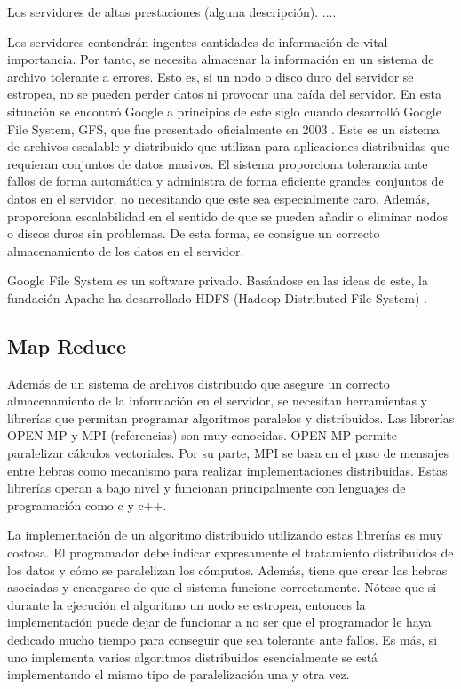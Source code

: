 \documentclass[10pt]{article}
\begin{document}
		Los servidores de altas prestaciones (alguna descripción). .... 
		
		Los servidores contendrán ingentes cantidades de información de vital importancia. Por tanto, se necesita almacenar la información en un sistema de archivo tolerante a errores. Esto es, si un nodo o disco duro del servidor se estropea, no se pueden perder datos ni provocar una caída del servidor. En esta situación se encontró Google a principios de este siglo cuando desarrolló Google File System, GFS, que fue presentado oficialmente en 2003 \cite{gfs}. Este es un sistema de archivos escalable y distribuido que utilizan para aplicaciones distribuidas que requieran conjuntos de datos masivos. El sistema proporciona tolerancia ante fallos de forma automática y administra de forma eficiente grandes conjuntos de datos en el servidor, no necesitando que este sea especialmente caro. Además, proporciona escalabilidad en el sentido de que se pueden añadir o eliminar nodos o discos duros sin problemas. De esta forma, se consigue un correcto almacenamiento de los datos en el servidor.
		
		Google File System es un software privado. Basándose en las ideas de este, la fundación Apache ha desarrollado HDFS (Hadoop Distributed File System) \cite{hdfs}.

	\subsection{Map Reduce}


		Además de un sistema de archivos distribuido que asegure un correcto almacenamiento de la información en el servidor, se necesitan herramientas y librerías que permitan programar algoritmos paralelos y distribuidos. Las librerías OPEN MP y MPI (referencias) son muy conocidas. OPEN MP permite paralelizar cálculos vectoriales. Por su parte, MPI se basa en el paso de mensajes entre hebras como mecanismo para realizar implementaciones distribuidas. Estas librerías operan a bajo nivel y funcionan principalmente con lenguajes de programación como c y c++. 
		
		La implementación de un algoritmo distribuido utilizando estas librerías es muy costosa. El programador debe indicar expresamente el tratamiento distribuidos de los datos y cómo se paralelizan los cómputos. Además, tiene que crear las hebras asociadas y encargarse de que el sistema funcione correctamente. Nótese que si durante la ejecución el algoritmo un nodo se estropea, entonces la implementación puede dejar de funcionar a no ser que el programador le haya dedicado mucho tiempo para conseguir que sea tolerante ante fallos. Es más, si uno implementa varios algoritmos distribuidos esencialmente se está implementando el mismo tipo de paralelización una y otra vez.
	
\end{document}
